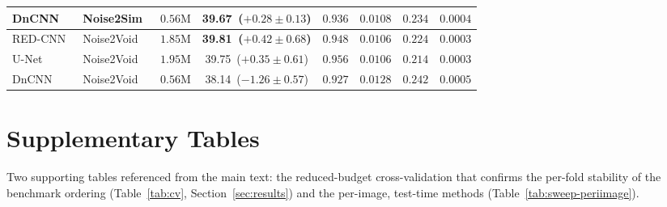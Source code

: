 \begin{table}[t]
\begin{tabular}{llrccccc}
    DnCNN~\cite{zhang2017beyond}     & Noise2Sim~\cite{niu2020noise2sim} & $0.56\mathrm{M}$ & 39.67 \,($+0.28{\pm}0.13$) & $0.936$ & $0.0108$ & $0.234$ & $0.0004$ \\
    \midrule
    RED-CNN~\cite{chen2017lowdose}   & Noise2Void~\cite{krull2019noise2void} & $1.85\mathrm{M}$ & \textbf{39.81 \,($+0.42{\pm}0.68$)} & $0.948$ & $0.0106$ & $0.224$ & $0.0003$ \\
    U-Net                            & Noise2Void~\cite{krull2019noise2void} & $1.95\mathrm{M}$ & 39.75 \,($+0.35{\pm}0.61$) & $0.956$ & $0.0106$ & $0.214$ & $0.0003$ \\
    DnCNN~\cite{zhang2017beyond}     & Noise2Void~\cite{krull2019noise2void} & $0.56\mathrm{M}$ & 38.14 \,($-1.26{\pm}0.57$) & $0.927$ & $0.0128$ & $0.242$ & $0.0005$ \\
    \bottomrule
  \end{tabular}
\end{table}

\section{Supplementary Tables}
\label{app:supp-tables}

Two supporting tables referenced from the main text: the reduced-budget
cross-validation that confirms the per-fold stability of the benchmark ordering
(Table~\ref{tab:cv}, Section~\ref{sec:results}) and the per-image, test-time
methods (Table~\ref{tab:sweep-periimage}).

